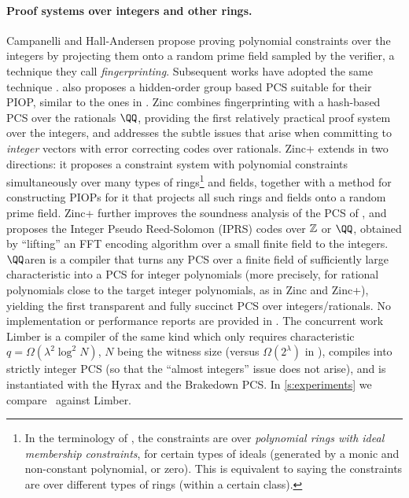\paragraph{Proof systems over integers and other rings.} Campanelli and Hall-Andersen \cite{zaratan} propose proving polynomial constraints over the integers by projecting them onto a random prime field sampled by the verifier, a technique they call \emph{fingerprinting}. Subsequent works have adopted the same technique \cite{zinc,qaren,zincplus,limber}. \cite{zaratan} also proposes a hidden-order group based PCS suitable for their PIOP, similar to the ones in \cite{DARK,BlockDARK}. Zinc \cite{zinc} combines fingerprinting with a hash-based PCS over the rationals $\QQ$, providing the first relatively practical proof system over the integers, and addresses the subtle issues that arise when committing to \emph{integer} vectors with error correcting codes over rationals. Zinc+ \cite{zincplus} extends \cite{zinc} in two directions: it proposes a constraint system with polynomial constraints simultaneously over many types of rings\footnote{In the terminology of \cite{zincplus}, the constraints are over \emph{polynomial rings with ideal membership constraints}, for certain types of ideals (generated by a monic and non-constant polynomial, or zero). This is equivalent to saying the constraints are over different types of rings (within a certain class).} and fields, together with a method for constructing PIOPs for it that projects  all such rings and fields onto a random prime field. Zinc+ further improves the soundness analysis of the PCS of \cite{zinc}, and proposes the Integer Pseudo Reed-Solomon (IPRS) codes over $\mathbb{Z}$ or $\QQ$, obtained by ``lifting'' an FFT encoding algorithm over a small finite field to the integers. $\QQ$aren \cite{qaren} is a compiler that turns any PCS over a finite field of sufficiently large characteristic into a PCS for integer polynomials (more precisely, for rational polynomials close to the target integer polynomials, as in Zinc and Zinc+), yielding the first transparent and fully succinct PCS over integers/rationals. No implementation or performance reports are provided in \cite{qaren}. The concurrent work Limber \cite{limber} is a compiler of the same kind which only requires characteristic $q=\Omega(\lambda^2 \log^2 N)$, $N$ being the witness size (versus $\Omega(2^\lambda)$ in \cite{qaren}), compiles into strictly integer PCS (so that the ``almost integers'' issue does not arise), and is instantiated with the Hyrax and the Brakedown PCS. In \cref{s:experiments} we compare \ftwoz \ against Limber.
\else %
